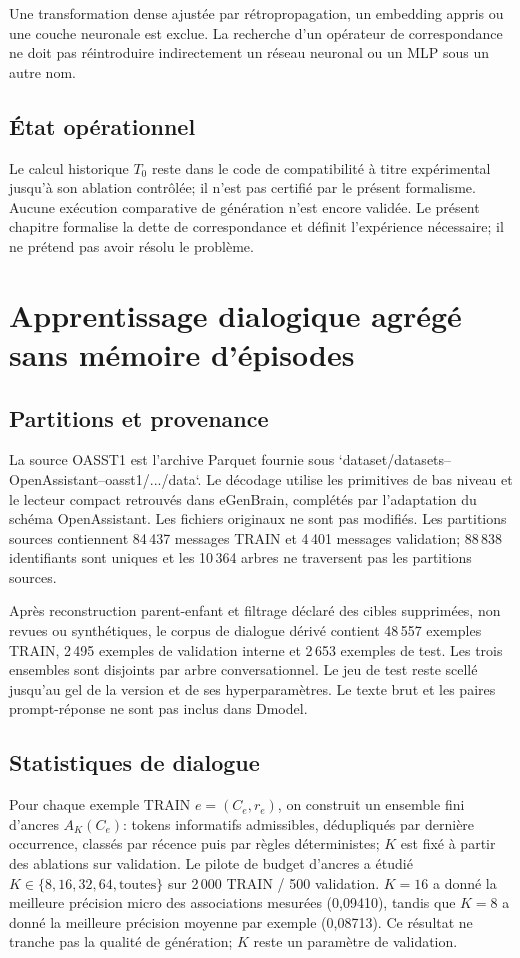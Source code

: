 \documentclass[11pt,a4paper]{report}
\begin{document}
Une transformation dense ajustée par rétropropagation, un embedding appris ou une couche neuronale est exclue. La recherche d'un opérateur de correspondance ne doit pas réintroduire indirectement un réseau neuronal ou un MLP sous un autre nom.

\section{État opérationnel}
Le calcul historique $T_0$ reste dans le code de compatibilité à titre expérimental jusqu'à son ablation contrôlée; il n'est pas certifié par le présent formalisme. Aucune exécution comparative de génération n'est encore validée. Le présent chapitre formalise la dette de correspondance et définit l'expérience nécessaire; il ne prétend pas avoir résolu le problème.

\chapter{Apprentissage dialogique agrégé sans mémoire d'épisodes}
\section{Partitions et provenance}
La source OASST1 est l'archive Parquet fournie sous `dataset/datasets--OpenAssistant--oasst1/.../data`. Le décodage utilise les primitives de bas niveau et le lecteur compact retrouvés dans eGenBrain, complétés par l'adaptation du schéma OpenAssistant. Les fichiers originaux ne sont pas modifiés. Les partitions sources contiennent 84\,437 messages TRAIN et 4\,401 messages validation; 88\,838 identifiants sont uniques et les 10\,364 arbres ne traversent pas les partitions sources.

Après reconstruction parent-enfant et filtrage déclaré des cibles supprimées, non revues ou synthétiques, le corpus de dialogue dérivé contient 48\,557 exemples TRAIN, 2\,495 exemples de validation interne et 2\,653 exemples de test. Les trois ensembles sont disjoints par arbre conversationnel. Le jeu de test reste scellé jusqu'au gel de la version et de ses hyperparamètres. Le texte brut et les paires prompt-réponse ne sont pas inclus dans Dmodel.

\section{Statistiques de dialogue}
Pour chaque exemple TRAIN $e=(C_e,r_e)$, on construit un ensemble fini d'ancres $A_K(C_e)$: tokens informatifs admissibles, dédupliqués par dernière occurrence, classés par récence puis par règles déterministes; $K$ est fixé à partir des ablations sur validation. Le pilote de budget d'ancres a étudié $K\in\{8,16,32,64,\text{toutes}\}$ sur 2\,000 TRAIN / 500 validation. $K=16$ a donné la meilleure précision micro des associations mesurées (0,09410), tandis que $K=8$ a donné la meilleure précision moyenne par exemple (0,08713). Ce résultat ne tranche pas la qualité de génération; $K$ reste un paramètre de validation.
\end{document}
